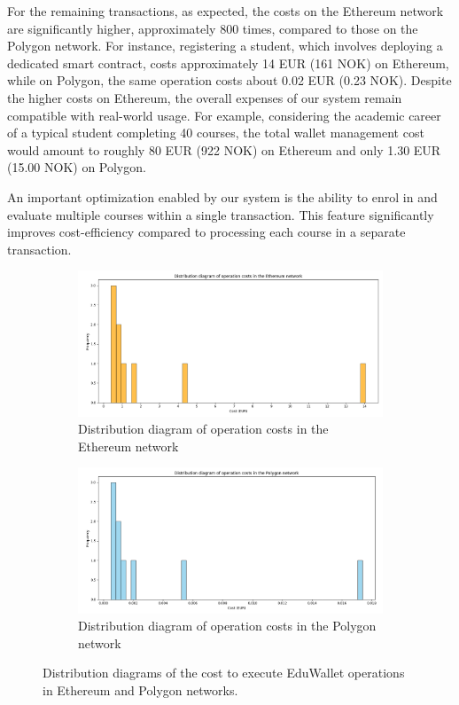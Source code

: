 

For the remaining transactions, as expected, the costs on the Ethereum network are significantly higher, approximately 800 times, compared to those on the Polygon network. For instance, registering a student, which involves deploying a dedicated smart contract, costs approximately 14 EUR (161 NOK) on Ethereum, while on Polygon, the same operation costs about 0.02 EUR (0.23 NOK). Despite the higher costs on Ethereum, the overall expenses of our system remain compatible with real-world usage. For example, considering the academic career of a typical student completing 40 courses, the total wallet management cost would amount to roughly 80 EUR (922 NOK) on Ethereum and only 1.30 EUR (15.00 NOK) on Polygon.   

An important optimization enabled by our system is the ability to enrol in and evaluate multiple courses within a single transaction. This feature significantly improves cost-efficiency compared to processing each course in a separate transaction.

\begin{figure}
    \begin{subfigure}{\textwidth}
      \includegraphics[width=\textwidth]{figures/ethCosts.png}
      \caption{Distribution diagram of operation costs in the Ethereum network}
      \label{fig:ethCosts}
    \end{subfigure}
    \hfill
    \begin{subfigure}{\textwidth}
      \includegraphics[width=\textwidth]{figures/polCosts.png}
      \caption{Distribution diagram of operation costs in the Polygon network}
      \label{fig:polCosts}
    \end{subfigure}
    \caption[Distribution diagram of operation costs in Ethereum and Polygon]{Distribution diagrams of the cost to execute EduWallet operations in Ethereum and Polygon networks.}
    \label{fig:operationCosts}
\end{figure}

